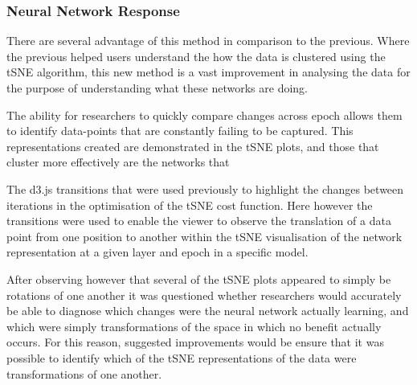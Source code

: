 \documentclass[a4paper,11pt,titlepage]{article}
\begin{document}
	
	\begin{figure}[H]
    			\centering	
    			\qquad

    			\caption{}%
    			\label{fig:pca_varimax}
	\end{figure}
	
	
		\subsubsection{Neural Network Response}
		There are several advantage of this method in comparison to the previous. Where the previous helped users understand the how the data is clustered using the tSNE algorithm, this new method is a vast improvement in analysing the data for the purpose of understanding what these networks are doing.
		\par 
		The ability for researchers to quickly compare changes across epoch allows them to identify data-points that are constantly failing to be captured. This representations created are demonstrated in the tSNE plots, and those that cluster more effectively are the networks that
		\par 
		The d3.js transitions that were used previously to highlight the changes between iterations in the optimisation of the tSNE cost function. Here however the transitions were used to enable the viewer to observe the translation of a data point from one position to another within the tSNE visualisation of the network representation at a given layer and epoch in a specific model.
		\par 
		After observing however that several of the tSNE plots appeared to simply be rotations of one another it was questioned whether researchers would accurately be able to diagnose which changes were the neural network actually learning, and which were simply transformations of the space in which no benefit actually occurs. For this reason, suggested improvements would be ensure that it was possible to identify which of the tSNE representations of the data were transformations of one another.
\end{document}

